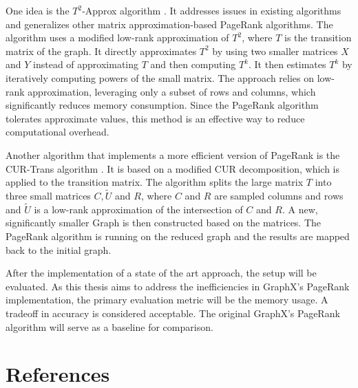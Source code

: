 \documentclass[a4paper,12pt]{article}
\begin{document}
One idea is the $T^2$-Approx algorithm \cite{wu_efficient_2024}. It addresses issues in existing algorithms and generalizes other matrix approximation-based PageRank algorithms. The algorithm uses a modified low-rank approximation of $T^2$, where $T$ is the transition matrix of the graph. It directly approximates $T^2$ by using two smaller matrices $X$ and $Y$ instead of approximating $T$ and then computing $T^k$. It then estimates $T^k$ by iteratively computing powers of the small matrix. The approach relies on low-rank approximation, leveraging only a subset of rows and columns, which significantly reduces memory consumption. Since the PageRank algorithm tolerates approximate values, this method is an effective way to reduce computational overhead.

Another algorithm that implements a more efficient version of PageRank is the CUR-Trans algorithm \cite{wu_efficient_2024}. It is based on a modified CUR decomposition, which is applied to the transition matrix. The algorithm splits the large matrix $T$ into three small matrices $C, \tilde{U}$ and $R$, where $C$ and $R$ are sampled columns and rows and $\tilde{U}$ is a low-rank approximation of the intersection of $C$ and $R$. A new, significantly smaller Graph is then constructed based on the matrices. The PageRank algorithm is running on the reduced graph and the results are mapped back to the initial graph.

After the implementation of a state of the art approach, the setup will be evaluated. As this thesis aims to address the inefficiencies in GraphX's PageRank implementation, the primary evaluation metric will be the memory usage. A tradeoff in accuracy is considered acceptable. The original GraphX's PageRank algorithm will serve as a baseline for comparison. 



\section{References}

\end{document}
